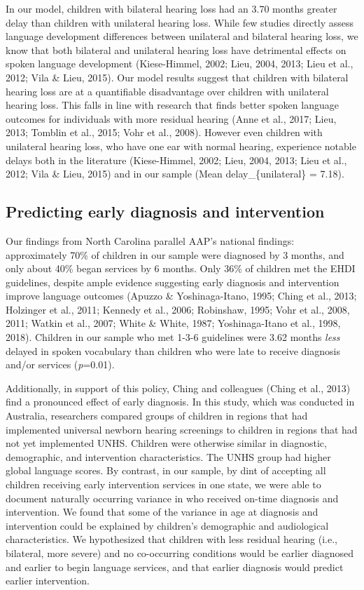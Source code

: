 \documentclass[
  english,
  man]{apa6}
\begin{document}
In our model, children with bilateral hearing loss had an 3.70 months greater delay than children with unilateral hearing loss. While few studies directly assess language development differences between unilateral and bilateral hearing loss, we know that both bilateral and unilateral hearing loss have detrimental effects on spoken language development (Kiese-Himmel, 2002; Lieu, 2004, 2013; Lieu et al., 2012; Vila \& Lieu, 2015). Our model results suggest that children with bilateral hearing loss are at a quantifiable disadvantage over children with unilateral hearing loss. This falls in line with research that finds better spoken language outcomes for individuals with more residual hearing (Anne et al., 2017; Lieu, 2013; Tomblin et al., 2015; Vohr et al., 2008). However even children with unilateral hearing loss, who have one ear with normal hearing, experience notable delays both in the literature (Kiese-Himmel, 2002; Lieu, 2004, 2013; Lieu et al., 2012; Vila \& Lieu, 2015) and in our sample (Mean delay\_\{unilateral\} = 7.18).

\hypertarget{predicting-early-diagnosis-and-intervention}{%
\subsection{Predicting early diagnosis and intervention}\label{predicting-early-diagnosis-and-intervention}}

Our findings from North Carolina parallel AAP's national findings: approximately 70\% of children in our sample were diagnosed by 3 months, and only about 40\% began services by 6 months. Only 36\% of children met the EHDI guidelines, despite ample evidence suggesting early diagnosis and intervention improve language outcomes (Apuzzo \& Yoshinaga-Itano, 1995; Ching et al., 2013; Holzinger et al., 2011; Kennedy et al., 2006; Robinshaw, 1995; Vohr et al., 2008, 2011; Watkin et al., 2007; White \& White, 1987; Yoshinaga-Itano et al., 1998, 2018). Children in our sample who met 1-3-6 guidelines were 3.62 months \emph{less} delayed in spoken vocabulary than children who were late to receive diagnosis and/or services (\emph{p}=0.01).

Additionally, in support of this policy, Ching and colleagues (Ching et al., 2013) find a pronounced effect of early diagnosis. In this study, which was conducted in Australia, researchers compared groups of children in regions that had implemented universal newborn hearing screenings to children in regions that had not yet implemented UNHS. Children were otherwise similar in diagnostic, demographic, and intervention characteristics. The UNHS group had higher global language scores. By contrast, in our sample, by dint of accepting all children receiving early intervention services in one state, we were able to document naturally occurring variance in who received on-time diagnosis and intervention. We found that some of the variance in age at diagnosis and intervention could be explained by children's demographic and audiological characteristics. We hypothesized that children with less residual hearing (i.e., bilateral, more severe) and no co-occurring conditions would be earlier diagnosed and earlier to begin language services, and that earlier diagnosis would predict earlier intervention.
\end{document}

